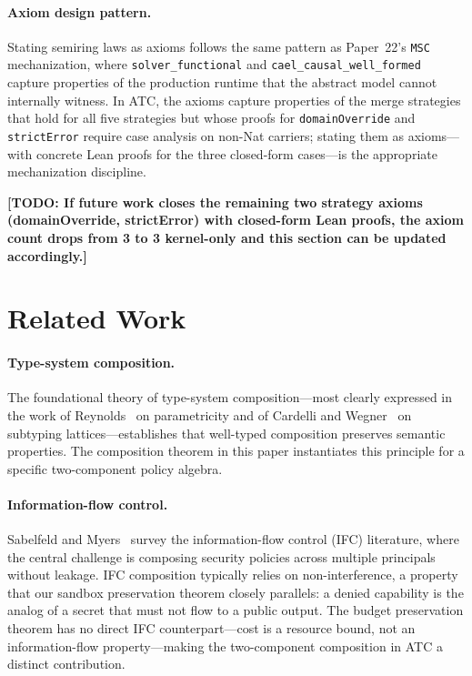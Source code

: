 \documentclass[sigconf]{acmart}
\newcommand{\todo}[1]{\textbf{[TODO: #1]}}
\newcommand{\ATC}{\textsc{ATC}}
\begin{document}
\paragraph{Axiom design pattern.}
Stating semiring laws as axioms follows the same pattern as Paper~22's
\texttt{MSC} mechanization, where \texttt{solver\_functional} and
\texttt{cael\_causal\_well\_formed} capture properties of the production
runtime that the abstract model cannot internally witness.  In \ATC{}, the
axioms capture properties of the merge strategies that hold for all five
strategies but whose proofs for \texttt{domainOverride} and
\texttt{strictError} require case analysis on non-Nat carriers; stating
them as axioms---with concrete Lean proofs for the three closed-form
cases---is the appropriate mechanization discipline.

\todo{If future work closes the remaining two strategy axioms (domainOverride,
strictError) with closed-form Lean proofs, the axiom count drops from 3 to 3
kernel-only and this section can be updated accordingly.}

\section{Related Work}
\label{sec:related}

\paragraph{Type-system composition.}
The foundational theory of type-system composition---most clearly expressed
in the work of Reynolds~\cite{reynolds1983types} on parametricity and of
Cardelli and Wegner~\cite{cardelli1985understanding} on subtyping
lattices---establishes that well-typed composition preserves semantic
properties.
The composition theorem in this paper instantiates this principle for a
specific two-component policy algebra.

\paragraph{Information-flow control.}
Sabelfeld and Myers~\cite{sabelfeld2003language} survey the information-flow
control (IFC) literature, where the central challenge is composing security
policies across multiple principals without leakage.
IFC composition typically relies on non-interference, a property that our
sandbox preservation theorem closely parallels: a denied capability is the
analog of a secret that must not flow to a public output.  The budget
preservation theorem has no direct IFC counterpart---cost is a resource
bound, not an information-flow property---making the two-component composition
in \ATC{} a distinct contribution.
\end{document}

